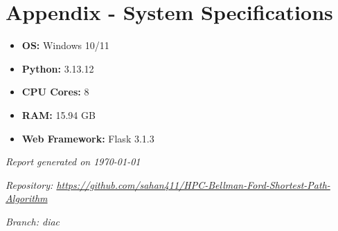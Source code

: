 \documentclass[12pt,a4paper]{article}
\begin{document}
\section*{Appendix - System Specifications}

\begin{itemize}
    \item \textbf{OS:} Windows 10/11
    \item \textbf{Python:} 3.13.12
    \item \textbf{CPU Cores:} 8
    \item \textbf{RAM:} 15.94 GB
    \item \textbf{Web Framework:} Flask 3.1.3
\end{itemize}

\vspace{2cm}

\noindent\makebox[\linewidth]{\rule{\textwidth}{0.4pt}}

\textit{Report generated on \today}

\textit{Repository: \url{https://github.com/sahan411/HPC-Bellman-Ford-Shortest-Path-Algorithm}}

\textit{Branch: diac}
\end{document}
